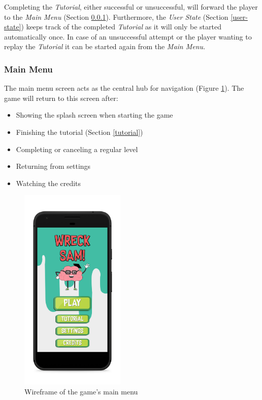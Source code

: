 Completing the \textit{Tutorial}, either successful or unsuccessful, will forward the player to the \textit{Main Menu} (Section \ref{main-menu}). Furthermore, the \textit{User State} (Section \ref{user-state}) keeps track of the completed \textit{Tutorial} as it will only be started automatically once. In case of an unsuccessful attempt or the player wanting to replay the \textit{Tutorial} it can be started again from the \textit{Main Menu}.

\subsubsection{Main Menu} \label{main-menu}
The main menu screen acts as the central hub for navigation (Figure \ref{fig_mainmenu}).
The game will return to this screen after:

\begin{itemize}
	\item Showing the splash screen when starting the game
    \item Finishing the tutorial (Section \ref{tutorial})
    \item Completing or canceling a regular level
    \item Returning from settings
    \item Watching the credits
\end{itemize}

\begin{figure}
  \includegraphics[width=5cm]{assets/wireframe_mainmenu.png}
  \caption{Wireframe of the game's main menu}
  \centering
  \label{fig_mainmenu}
\end{figure}

